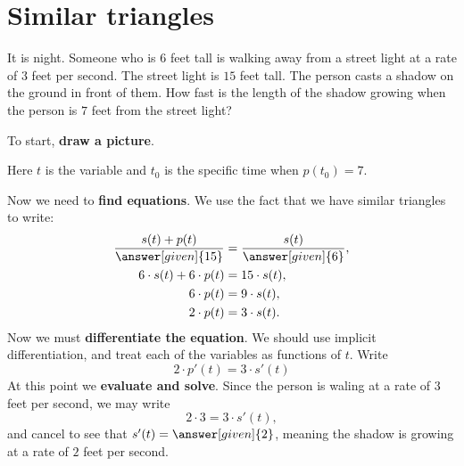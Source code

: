 \documentclass{ximera}
\begin{document}
\section{Similar triangles}


\begin{example}
  It is night. Someone who is $6$ feet tall is walking away from a
  street light at a rate of $3$ feet per second.  The street light is
  $15$ feet tall.  The person casts a shadow on the ground in front of
  them. How fast is the length of the shadow growing when the person
  is $7$ feet from the street light?

  \begin{explanation}
    To start, \textbf{draw a picture}.
    \begin{image}
    \end{image}
    Here $t$ is the variable and $t_0$ is the specific time when
    $p(t_0) = 7$.
    
    Now we need to \textbf{find equations}. We use the fact that we
    have similar triangles to write:
    \begin{align*}
      \frac{s(t)+p(t)}{\answer[given]{15}} &= \frac{s(t)}{\answer[given]{6}},\\
      6\cdot s(t) + 6 \cdot p(t) &= 15\cdot s(t),\\
      6\cdot p(t) &=9\cdot s(t),\\
      2\cdot p(t) &=3 \cdot s(t). \\
    \end{align*}
    Now we must \textbf{differentiate the equation}. We should use
    implicit differentiation, and treat each of the variables as
    functions of $t$. Write
    \[
    2\cdot p'(t) =3 \cdot s'(t)
    \]
    At this point we \textbf{evaluate and solve}. Since the person is waling at a rate of $3$ feet per second, we may write
    \[
    2\cdot 3 = 3 \cdot s'(t),
    \]
    and cancel to see that $s'(t) = \answer[given]{2}$, meaning the shadow is growing
    at a rate of $2$ feet per second.
  \end{explanation}
\end{example}
\end{document}
